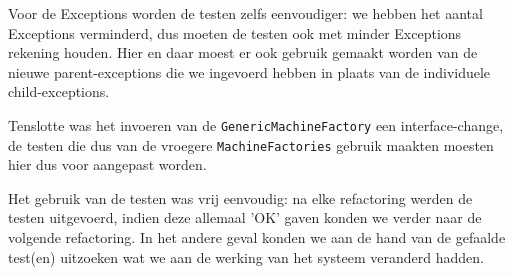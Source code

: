\documentclass[a4paper]{article}
\begin{document}
Voor de Exceptions worden de testen zelfs eenvoudiger: we hebben het aantal Exceptions verminderd, dus moeten de testen ook met minder Exceptions rekening houden. Hier en daar moest er ook gebruik gemaakt worden van de nieuwe parent-exceptions die we ingevoerd hebben in plaats van de individuele child-exceptions.

Tenslotte was het invoeren van de \texttt{GenericMachineFactory} een interface-change, de testen die dus van de vroegere \texttt{MachineFactories} gebruik maakten moesten hier dus voor aangepast worden.

Het gebruik van de testen was vrij eenvoudig: na elke refactoring werden de testen uitgevoerd, indien deze allemaal 'OK' gaven konden we verder naar de volgende refactoring. In het andere geval konden we aan de hand van de gefaalde test(en) uitzoeken wat we aan de werking van het systeem veranderd hadden.
\end{document}
